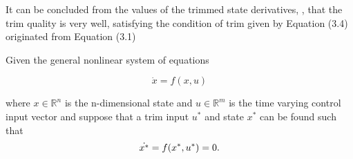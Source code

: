 \documentclass[12pt]{article}
\begin{document}
It can be concluded from the values of the trimmed state derivatives,  , that the trim 
quality is very well, satisfying the condition of trim given by Equation (3.4) 
originated from Equation (3.1)

Given the general nonlinear system of equations 

\begin{equation}
    \dot{x} = f(x, u)
\end{equation}


where $x \in \mathbb{R}^n$ is the n-dimensional state and $u \in \mathbb{R}^m$ is the time varying control input vector and suppose that a trim input $u^*$ and state $x^*$ can be found such that \\

\begin{equation}
    \dot{x^*}  = f(x^*, u^*) = 0. \\ 
\end{equation}
\end{document}
